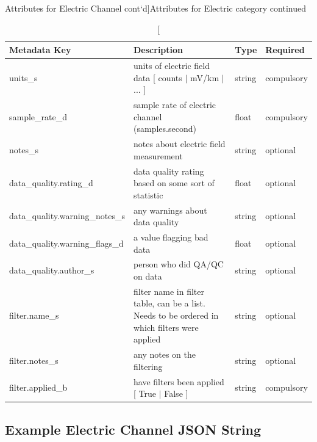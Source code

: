 \documentclass{article}
\begin{document}
\newpage
\begin{table}[htb!]
	\caption[Attributes for Electric Channel cont`d]{Attributes for Electric category continued}
	\begin{tabular}{|l|p{3in}|l|l|}
		\hline
		\textbf{Metadata Key} & \textbf{Description} & \textbf{Type} & \textbf{Required} \\ \hline
		units\_s & units of electric field data [ counts $|$ mV/km $|$ ... ] & string & compulsory \\ \hline
		sample\_rate\_d & sample rate of electric channel (samples.second) & float & compulsory \\ \hline
		notes\_s & notes about electric field measurement & string &  optional \\ \hline
		data\_quality.rating\_d & data quality rating based on some sort of statistic & float & optional \\ \hline
		data\_quality.warning\_notes\_s & any warnings about data quality & string & optional \\ \hline
		data\_quality.warning\_flags\_d & a value flagging bad data  & float &  optional \\ \hline
		data\_quality.author\_s & person who did QA/QC on data & string &  optional \\ \hline
		filter.name\_s & filter name in filter table, can be a list. Needs to be ordered in which filters were applied & string &  optional \\ \hline
		filter.notes\_s & any notes on the filtering & string &  optional \\ \hline
		filter.applied\_b & have filters been applied [ True $|$ False ] & string & compulsory \\ \hline
		\end{tabular}
		\label{tab:electric02}
\end{table}	

\newpage
\subsection{Example Electric Channel JSON String}
\end{document}
